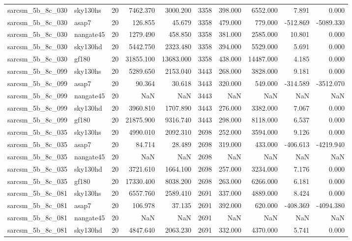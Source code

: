 \begin{longtable}{llrrrrrrrr}
sarcsm\_5b\_8c\_030 & sky130hs & 20 & 7462.370 & 3000.200 & 3358 & 398.000 & 6552.000 & 7.891 & 0.000 \\
sarcsm\_5b\_8c\_030 & asap7 & 20 & 126.855 & 45.679 & 3358 & 479.000 & 779.000 & -512.869 & -5089.330 \\
sarcsm\_5b\_8c\_030 & nangate45 & 20 & 1279.490 & 458.850 & 3358 & 381.000 & 2585.000 & 10.801 & 0.000 \\
sarcsm\_5b\_8c\_030 & sky130hd & 20 & 5442.750 & 2323.480 & 3358 & 394.000 & 5529.000 & 5.691 & 0.000 \\
sarcsm\_5b\_8c\_030 & gf180 & 20 & 31855.100 & 13683.000 & 3358 & 438.000 & 14487.000 & 4.185 & 0.000 \\
sarcsm\_5b\_8c\_099 & sky130hs & 20 & 5289.650 & 2153.040 & 3443 & 268.000 & 3828.000 & 9.181 & 0.000 \\
sarcsm\_5b\_8c\_099 & asap7 & 20 & 90.364 & 30.618 & 3443 & 320.000 & 549.000 & -314.589 & -3512.070 \\
sarcsm\_5b\_8c\_099 & nangate45 & 20 & NaN & NaN & 3443 & NaN & NaN & NaN & NaN \\
sarcsm\_5b\_8c\_099 & sky130hd & 20 & 3960.810 & 1707.890 & 3443 & 276.000 & 3382.000 & 7.067 & 0.000 \\
sarcsm\_5b\_8c\_099 & gf180 & 20 & 21875.900 & 9316.740 & 3443 & 298.000 & 8118.000 & 6.537 & 0.000 \\
sarcsm\_5b\_8c\_035 & sky130hs & 20 & 4990.010 & 2092.310 & 2698 & 252.000 & 3594.000 & 9.126 & 0.000 \\
sarcsm\_5b\_8c\_035 & asap7 & 20 & 84.714 & 28.489 & 2698 & 319.000 & 433.000 & -406.613 & -4219.940 \\
sarcsm\_5b\_8c\_035 & nangate45 & 20 & NaN & NaN & 2698 & NaN & NaN & NaN & NaN \\
sarcsm\_5b\_8c\_035 & sky130hd & 20 & 3721.610 & 1664.100 & 2698 & 257.000 & 3234.000 & 7.176 & 0.000 \\
sarcsm\_5b\_8c\_035 & gf180 & 20 & 17330.400 & 8038.200 & 2698 & 263.000 & 6266.000 & 6.181 & 0.000 \\
sarcsm\_5b\_8c\_081 & sky130hs & 20 & 6557.760 & 2589.410 & 2691 & 337.000 & 4889.000 & 8.424 & 0.000 \\
sarcsm\_5b\_8c\_081 & asap7 & 20 & 106.978 & 37.135 & 2691 & 392.000 & 620.000 & -408.369 & -4094.380 \\
sarcsm\_5b\_8c\_081 & nangate45 & 20 & NaN & NaN & 2691 & NaN & NaN & NaN & NaN \\
sarcsm\_5b\_8c\_081 & sky130hd & 20 & 4847.640 & 2063.230 & 2691 & 332.000 & 4370.000 & 5.741 & 0.000 \\

\end{longtable}
